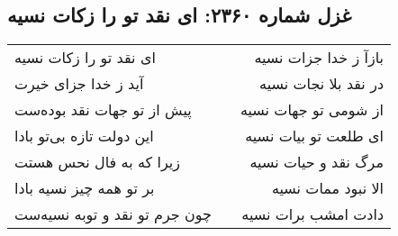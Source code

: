 \begin{center}
\section*{غزل شماره ۲۳۶۰: ای نقد تو را زکات نسیه}
\label{sec:2360}
\begin{longtable}{l p{0.5cm} r}
ای نقد تو را زکات نسیه
&&
بازآ ز خدا جزات نسیه
\\
آید ز خدا جزای خیرت
&&
در نقد بلا نجات نسیه
\\
پیش از تو جهات نقد بوده‌ست
&&
از شومی تو جهات نسیه
\\
این دولت تازه بی‌تو بادا
&&
ای طلعت تو بیات نسیه
\\
زیرا که به فال نحس هستت
&&
مرگ نقد و حیات نسیه
\\
بر تو همه چیز نسیه بادا
&&
الا نبود ممات نسیه
\\
چون جرم تو نقد و توبه نسیه‌ست
&&
دادت امشب برات نسیه
\\
\end{longtable}
\end{center}
